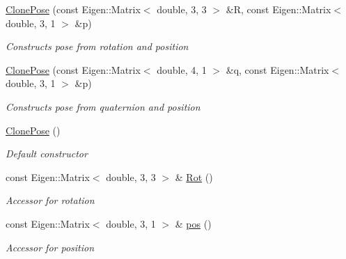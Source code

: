 \begin{DoxyCompactItemize}
\item 
\mbox{\label{structov__core_1_1FeatureInitializer_1_1ClonePose_a03004e652d7e39db06ba1efee87baf35}} 
\hyperlink{structov__core_1_1FeatureInitializer_1_1ClonePose_a03004e652d7e39db06ba1efee87baf35}{Clone\+Pose} (const Eigen\+::\+Matrix$<$ double, 3, 3 $>$ \&R, const Eigen\+::\+Matrix$<$ double, 3, 1 $>$ \&p)
\begin{DoxyCompactList}\small\item\em Constructs pose from rotation and position \end{DoxyCompactList}\item 
\mbox{\label{structov__core_1_1FeatureInitializer_1_1ClonePose_a8a71caa7b8fe89be792cf7392035303b}} 
\hyperlink{structov__core_1_1FeatureInitializer_1_1ClonePose_a8a71caa7b8fe89be792cf7392035303b}{Clone\+Pose} (const Eigen\+::\+Matrix$<$ double, 4, 1 $>$ \&q, const Eigen\+::\+Matrix$<$ double, 3, 1 $>$ \&p)
\begin{DoxyCompactList}\small\item\em Constructs pose from quaternion and position \end{DoxyCompactList}\item 
\mbox{\label{structov__core_1_1FeatureInitializer_1_1ClonePose_a547f0ca911c273202c71ae5ef0dd21b8}} 
\hyperlink{structov__core_1_1FeatureInitializer_1_1ClonePose_a547f0ca911c273202c71ae5ef0dd21b8}{Clone\+Pose} ()
\begin{DoxyCompactList}\small\item\em Default constructor \end{DoxyCompactList}\item 
\mbox{\label{structov__core_1_1FeatureInitializer_1_1ClonePose_a0ceb30018eb94165b9ae122f9a644b3c}} 
const Eigen\+::\+Matrix$<$ double, 3, 3 $>$ \& \hyperlink{structov__core_1_1FeatureInitializer_1_1ClonePose_a0ceb30018eb94165b9ae122f9a644b3c}{Rot} ()
\begin{DoxyCompactList}\small\item\em Accessor for rotation \end{DoxyCompactList}\item 
\mbox{\label{structov__core_1_1FeatureInitializer_1_1ClonePose_aaa93798264c4123ba8cbdd0daa1c8f95}} 
const Eigen\+::\+Matrix$<$ double, 3, 1 $>$ \& \hyperlink{structov__core_1_1FeatureInitializer_1_1ClonePose_aaa93798264c4123ba8cbdd0daa1c8f95}{pos} ()
\begin{DoxyCompactList}\small\item\em Accessor for position \end{DoxyCompactList}\end{DoxyCompactItemize}
